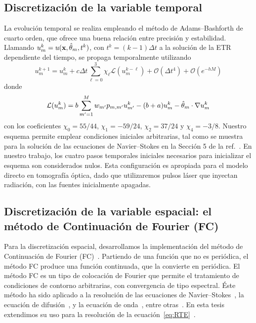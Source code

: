 \subsection{Discretización de la variable temporal}
\label{sec:adamsbashforth}
La evolución temporal se realiza empleando el método de Adams--Bashforth de cuarto orden, 
que ofrece una 
buena relación entre precisión y estabilidad.
Llamando $u_m^k=u(\mathbf{x},\hat{\theta}_m,t^k)$, con $t^{k}=(k-1)\Delta t$ a la solución 
de la ETR 
dependiente del tiempo, se propaga temporalmente utilizando
\begin{equation}
u_m^{k+1} =  u_m^k + c\Delta t \sum_{\ell=0}^3 \chi_{\ell} \mathcal{L} ( u^{k-\ell}_m)  
+\mathcal{O}(\Delta t^4)+\mathcal{O}(e^{-hM})
\label{eq:RTEAB4}
\end{equation}
donde
\begin{equation}
\mathcal{L} ( u_m^k) = b\sum_{m'=1}^{M} w_{m'} p_{m,m'} u_{m'}^k-(b+a)u_m^k-\hat{\theta}_m \cdot \nabla u_m^k \notag
\label{eq:RTEAB4L}
\end{equation}
con los coeficientes $\chi_0=55/44$, 
$\chi_1=-59/24$, $\chi_2=37/24$ y $\chi_4=-3/8$. 
Nuestro esquema permite emplear condiciones iniciales arbitrarias, tal como se muestra para  
la solución de las ecuaciones de Navier--Stokes en la Sección 5 de la ref.~\cite{Bruno2016}.
En nuestro trabajo, los cuatro pasos temporales iniciales necesarios para inicializar 
el esquema son considerados nulos. Esta configuración es 
apropiada para 
el modelo directo en tomografía óptica, dado que utilizaremos pulsos láser 
que inyectan radiación, con las fuentes inicialmente apagadas. 

\subsection{Discretización de la variable espacial: el método de Continuación de Fourier (FC)}
\label{sec:fcmethod}
Para la discretización espacial, desarrollamos la implementación 
del método de Continuación de Fourier (FC)~\cite{Lyon2010,Albin2011,Amlani2016}.  
Partiendo de una función que no es periódica, el método FC produce 
una función continuada, que la convierte en periódica. 
El método FC es un tipo de colocación de Fourier que permite 
el tratamiento de condiciones de contorno arbitrarias, con 
convergencia de tipo espectral.
Éste método ha sido aplicado 
a la resolución de las ecuaciones de Navier--Stokes~\cite{Cubillos2019}, la ecuación de difusión~\cite{Bruno}, 
y la ecuación de onda~\cite{}, entre otras~\cite{Fontana}. En esta tesis extendimos su uso  
para la resolución de la ecuación~\eqref{eq:RTE}~\cite{Gaggioli2019}.

